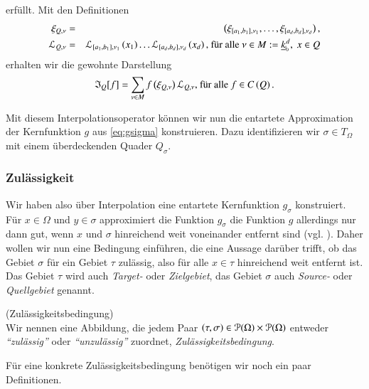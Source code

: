       erfüllt. Mit den Definitionen
      \begin{eqnarray*}
	\xi_{Q ,\nu} &=& \left(\xi_{[a_1,b_1],\nu_1} ,    \dots , \xi_{[a_d,b_d],\nu_d}\right),\\
	\lag_{Q,\nu} &=& \lag_{[a_1,b_1],\nu_1}\left(x_1\right) \dots  \lag_{[a_d,b_d],\nu_d}\left(x_d\right) \text{, für alle } \nu \in M := \nullhaken{k}^d, \ x \in Q
      \end{eqnarray*}
      erhalten wir die gewohnte Darstellung
      \begin{equation*}
	\mathfrak{I}_Q[f] = \sum_{\nu \in M} f\left(\xi_{Q,\nu}\right)\mathcal{L}_{Q,\nu} \text{, für alle } f \in C\left(Q\right).
      \end{equation*}
      
      Mit diesem Interpolationsoperator können wir nun die entartete Approximation der Kernfunktion $g$ aus \autoref{eq:gsigma} konstruieren. Dazu identifizieren wir $\sigma \in T_\Omega$
      mit einem überdeckenden Quader $Q_\sigma$.
    
    \subsubsection{Zulässigkeit}
    \label{sek:zul}
      Wir haben also über Interpolation eine entartete Kernfunktion $g_\sigma$ konstruiert. Für $x \in \Omega$ und $y \in \sigma$ approximiert die Funktion $g_\sigma$ die Funktion $g$ allerdings 
      nur dann gut, wenn $x$ und $\sigma$ hinreichend weit voneinander entfernt sind (vgl. \citet{h2diss, nichtlokop}). 
      Daher wollen wir nun eine Bedingung einführen, die eine Aussage darüber trifft, ob das Gebiet $\sigma$ für ein Gebiet $\tau$ zulässig, also für alle $x \in \tau$
      hinreichend weit entfernt ist. Das Gebiet $\tau$ wird auch \textit{Target-} oder \textit{Zielgebiet}, das Gebiet $\sigma$ auch \textit{Source-} oder \textit{Quellgebiet} genannt.
      
      \begin{defn}
	(Zulässigkeitsbedingung)\\
	Wir nennen eine Abbildung, die jedem Paar $\left(\tau, \sigma\right) \in \mathcal{P}(\Omega) \times \mathcal{P}(\Omega)$ entweder \textit{``zulässig''} oder \textit{``unzulässig''} zuordnet, 
	\textit{Zulässigkeitsbedingung}.       
      \end{defn}
      
      Für eine konkrete Zulässigkeitsbedingung benötigen wir noch ein paar Definitionen.
            
